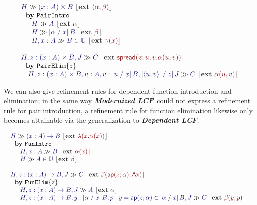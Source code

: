 \documentclass[11pt]{article}
\theoremstyle{definition}
\theoremstyle{remark}
\numberwithin{equation}{section}
\def\IModeColorName{MidnightBlue}
\def\OModeColorName{Maroon}
\newcommand\IMode[1]{{\color{\IModeColorName}{#1}}}
\newcommand\OMode[1]{{\color{\OModeColorName}{#1}}}
\newcommand\MemberUnmoded[2]{#1\in #2}
\newcommand\EqMemberUnmoded[3]{#1 = #2\in #3}
\newcommand\DPairIntroRuleNullary{\mathtt{PairIntro}}
\newcommand\DPairElimRule[1]{\mathtt{PairElim}\{#1\}}
\newcommand\DFunIntroRule{\mathtt{FunIntro}}
\newcommand\DFunElimRule[1]{\mathtt{FunElim}\{#1\}}
\newcommand\TyDPair[3]{(#2:#1) \times #3}
\newcommand\TyDFun[3]{(#2:#1) \to #3}
\newcommand\Lam[2]{\lambda(#1.#2)}
\newcommand\Ap[2]{\mathsf{ap}(#1;#2)}
\newcommand\Ax{\mathsf{Ax}}
\newcommand\Tuple[1]{\left\langle#1\right\rangle}
\newcommand\Spread[4]{\mathsf{spread}(#1;#2,#3.#4)}
\newcommand\TyUniv{\mathbb{U}}
\newcommand\Subst[3]{\left[#1\;/\;#2\right]#3}
\newcommand\ModLCF{\textbf{\emph{Modernized LCF}}}
\newcommand\DepLCF{\textbf{\emph{Dependent LCF}}}
\newcommand\Seq[2]{#1 \gg #2}
\newcommand\Ext[1]{{\color{dark-gray}\left\lfloor\mathbf{ext}\ \OMode{#1}\right\rfloor}}
\newcommand\SeqExt[3]{
  \Seq{\IMode{#1}}{\IMode{#2}}\ \Ext{#3}
}
\newcommand\NuprlRule[3]{%
  \begin{array}{l}%
    #2\\
    \ \ \mathbf{by}\ #1\\
    \quad #3
  \end{array}%
}
\begin{document}
\[
  \begin{array}{l}
    \NuprlRule{\DPairIntroRuleNullary}{
      \SeqExt{H}{\TyDPair{A}{x}{B}}{\Tuple{\alpha,\beta}}
    }{
      \begin{array}{l}
        \SeqExt{H}{A}{\alpha}\\
        \SeqExt{H}{\Subst{\alpha}{x}{B}}{\beta}\\
        \SeqExt{H,x:A}{\MemberUnmoded{B}{\TyUniv}}{\gamma(x)}
      \end{array}
    }\\\\
    \NuprlRule{\DPairElimRule{z}}{
      \SeqExt{H,z:\TyDPair{A}{x}{B},J}{C}{
        \Spread{z}{u}{v}{\alpha(u,v)}
      }
    }{
      \SeqExt{H,z:\TyDPair{A}{x}{B},u:A,v:\Subst{u}{x}{B},\Subst{\Tuple{u,v}}{z}{J}}{C}{
        \alpha(u,v)
      }
    }
  \end{array}
\]

We can also give refinement rules for dependent function introduction and
elimination; in the same way \ModLCF\ could not express a refinement rule for
pair introduction, a refinement rule for function elimination likewise only
becomes attainable via the generalization to \DepLCF.

\[
  \begin{array}{l}
    \NuprlRule{\DFunIntroRule}{
      \SeqExt{H}{\TyDFun{A}{x}{B}}{\Lam{x}{\alpha(x)}}
    }{
      \begin{array}{l}
        \SeqExt{H,x:A}{B}{\alpha(x)}\\
        \SeqExt{H}{\MemberUnmoded{A}{\TyUniv}}{\beta}
      \end{array}
    }\\\\
    \NuprlRule{\DFunElimRule{z}}{
      \SeqExt{
        H,z:\TyDFun{A}{x}{B},J
      }{C}{
        \beta(\Ap{z}{\alpha}, \Ax)
      }
    }{
      \begin{array}{l}
        \SeqExt{H,z:\TyDFun{A}{x}{B}, J}{A}{\alpha}\\
        \SeqExt{
          H,z:\TyDFun{A}{x}{B},%
          y:\Subst{\alpha}{x}{B},%
          p:\EqMemberUnmoded{y}{\Ap{z}{\alpha}}{\Subst{\alpha}{x}{B}}, J
        }{C}{
          \beta(y,p)
        }
      \end{array}
    }
  \end{array}
\]
\end{document}
